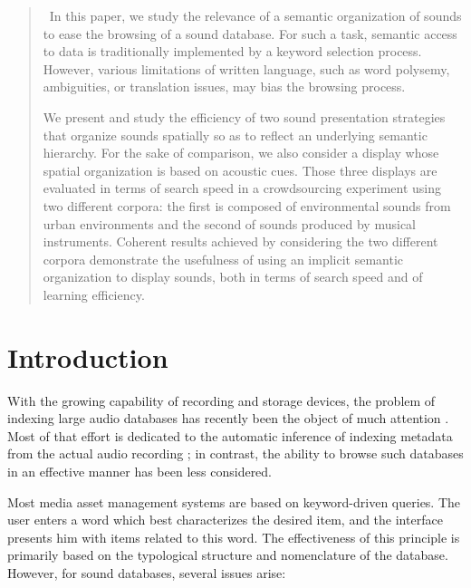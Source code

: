 \documentclass{aes2e}
\begin{document}
\maketitle

\begin{abstract}
~In this paper, we study the relevance of a semantic organization of sounds to ease the browsing of a sound database. For such a task, semantic access to data is traditionally implemented by a keyword selection process. However, various limitations of written language, such as word polysemy, ambiguities, or translation issues, may bias the browsing process.

We present and study the efficiency of two sound presentation strategies that organize sounds spatially so as to reflect an underlying semantic hierarchy. For the sake of comparison, we also consider a display whose spatial organization is based on acoustic cues. Those three displays are evaluated in terms of search speed in a crowdsourcing experiment using two different corpora: the first is composed of environmental sounds from urban environments and the second of sounds produced by musical instruments. Coherent results achieved by considering the two different corpora demonstrate the usefulness of using an implicit semantic organization to display sounds, both in terms of search speed and of learning efficiency. 
\end{abstract}


\section{Introduction}

With the growing capability of recording and storage devices, the problem of indexing large audio databases has recently been the object of much attention \cite{Wold1996}. Most of that effort is dedicated to the automatic inference of indexing metadata from the actual audio recording \cite{Zhang1999, tzanetakis2002musical}; in contrast, the ability to browse such databases in an effective manner has been less considered.

Most media asset management systems are based on keyword-driven queries. The user enters a word which best characterizes the desired item, and the interface presents him with items related to this word. The effectiveness of this principle is primarily based on the typological structure and nomenclature of the database. However, for sound databases, several issues arise:
\end{document}
